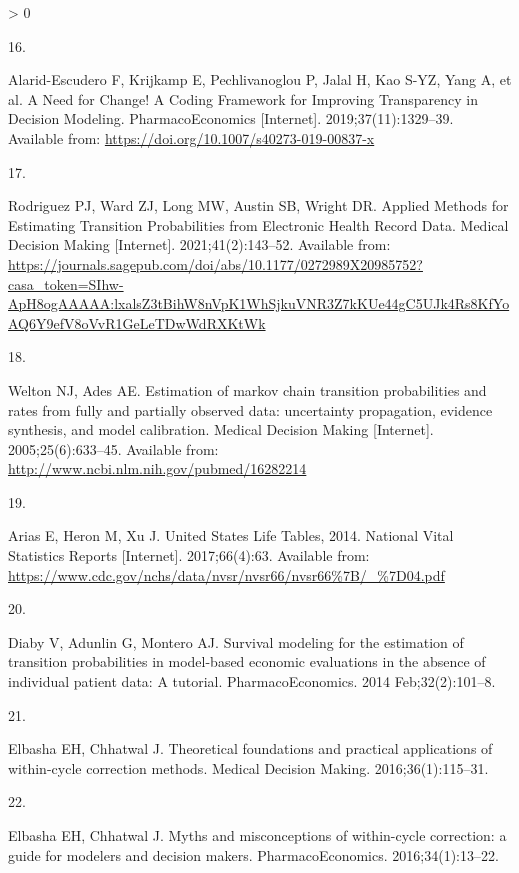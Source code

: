 \documentclass[
]{article}
\newlength{\cslhangindent}
\newlength{\csllabelwidth}
\newenvironment{CSLReferences}[2] %
 {%
  \setlength{\parindent}{0pt}
  \ifodd #1 \everypar{\setlength{\hangindent}{\cslhangindent}}\ignorespaces\fi
  \ifnum #2 > 0
  \setlength{\parskip}{#2\baselineskip}
  \fi
 }%
 {}
\newcommand{\CSLLeftMargin}[1]{\parbox[t]{\csllabelwidth}{#1}}
\newcommand{\CSLRightInline}[1]{\parbox[t]{\linewidth - \csllabelwidth}{#1}\break}
\begin{document}
\begin{CSLReferences}{0}{0}
\leavevmode\hypertarget{ref-Alarid-Escudero2019e}{}%
\CSLLeftMargin{16. }
\CSLRightInline{Alarid-Escudero F, Krijkamp E, Pechlivanoglou P, Jalal H, Kao S-YZ, Yang A, et al. {A Need for Change! A Coding Framework for Improving Transparency in Decision Modeling}. PharmacoEconomics {[}Internet{]}. 2019;37(11):1329--39. Available from: \url{https://doi.org/10.1007/s40273-019-00837-x}}

\leavevmode\hypertarget{ref-Rodriguez2021}{}%
\CSLLeftMargin{17. }
\CSLRightInline{Rodriguez PJ, Ward ZJ, Long MW, Austin SB, Wright DR. {Applied Methods for Estimating Transition Probabilities from Electronic Health Record Data}. Medical Decision Making {[}Internet{]}. 2021;41(2):143--52. Available from: \url{https://journals.sagepub.com/doi/abs/10.1177/0272989X20985752?casa_token=SIhw-ApH8ogAAAAA:lxalsZ3tBihW8nVpK1WhSjkuVNR3Z7kKUe44gC5UJk4Rs8KfYoAQ6Y9efV8oVvR1GeLeTDwWdRXKtWk}}

\leavevmode\hypertarget{ref-Welton2005}{}%
\CSLLeftMargin{18. }
\CSLRightInline{Welton NJ, Ades AE. {Estimation of markov chain transition probabilities and rates from fully and partially observed data: uncertainty propagation, evidence synthesis, and model calibration.} Medical Decision Making {[}Internet{]}. 2005;25(6):633--45. Available from: \url{http://www.ncbi.nlm.nih.gov/pubmed/16282214}}

\leavevmode\hypertarget{ref-Arias2017}{}%
\CSLLeftMargin{19. }
\CSLRightInline{Arias E, Heron M, Xu J. {United States Life Tables, 2014}. National Vital Statistics Reports {[}Internet{]}. 2017;66(4):63. Available from: \url{https://www.cdc.gov/nchs/data/nvsr/nvsr66/nvsr66\%7B/_\%7D04.pdf}}

\leavevmode\hypertarget{ref-Diaby2014}{}%
\CSLLeftMargin{20. }
\CSLRightInline{Diaby V, Adunlin G, Montero AJ. {Survival modeling for the estimation of transition probabilities in model-based economic evaluations in the absence of individual patient data: A tutorial}. PharmacoEconomics. 2014 Feb;32(2):101--8. }

\leavevmode\hypertarget{ref-Elbasha2016}{}%
\CSLLeftMargin{21. }
\CSLRightInline{Elbasha EH, Chhatwal J. {Theoretical foundations and practical applications of within-cycle correction methods}. Medical Decision Making. 2016;36(1):115--31. }

\leavevmode\hypertarget{ref-Elbasha2016a}{}%
\CSLLeftMargin{22. }
\CSLRightInline{Elbasha EH, Chhatwal J. {Myths and misconceptions of within-cycle correction: a guide for modelers and decision makers}. PharmacoEconomics. 2016;34(1):13--22. }


\end{CSLReferences}
\end{document}
